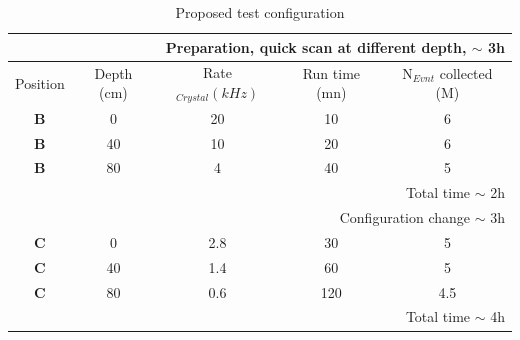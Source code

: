  \begin{table}[htp]
\caption{Proposed test configuration}
\begin{center}
\begin{tabular}{|c|c|c|c|c|}
\hline\hline
\multicolumn{5}{r}{Preparation, quick scan at different depth,   $\sim$ 3h } \\
\hline
Position  &Depth  (cm)& Rate$_{Crystal} (kHz)$  &Run time (mn) & N$_{Evnt}$ collected (M)  \\
\hline\hline
 {\bf B} & 0 &  20 & 10 & 6\\
 \hline
 {\bf B}  & 40 &  10 & 20 & 6 \\
 \hline
 {\bf B}  & 80 &  4 & 40 & 5\\
 \hline
\multicolumn{5}{|r|}{Total time    $\sim$ 2h }\\
 \hline\hline
\multicolumn{5}{r}{Configuration change  $\sim$ 3h } \\
 \hline\hline
 {\bf C} & 0 &  2.8 & 30 & 5\\
 \hline
 {\bf C}  & 40 &  1.4 & 60 & 5 \\
 \hline
 {\bf C}  & 80 &  0.6 & 120 &4.5\\
 \hline
\multicolumn{5}{|r|}{Total time    $\sim$ 4h }\\
 \hline\hline
\end{tabular}
\end{center}
\label{tab:test}
\end{table}

